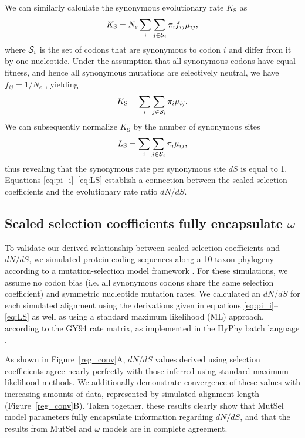 \documentclass[11pt]{article}
\begin{document}
We can similarly calculate the synonymous evolutionary rate $K_\text{S}$ as 
\begin{equation}\label{eq:KS}
  K_\text{S} = N_e \sum_i \sum_{j \in {\cal S}_i} \pi_i  f_{ij}\mu_{ij},
\end{equation} where ${\cal S}_i$ is the set of codons that are synonymous to codon $i$ and differ from it by one nucleotide. Under the assumption that all synonymous codons have equal fitness, and hence all synonymous mutations are selectively neutral, we have $f_{ij}=1/N_e$ \cite{CrowKimura1970}, yielding \begin{equation}\label{eq:KS_2}
  K_\text{S} = \sum_i \sum_{j \in {\cal S}_i} \pi_i  \mu_{ij}.
\end{equation} We can subsequently normalize $K_\text{S}$ by the number of synonymous sites 
\begin{equation}\label{eq:LS}
  L_\text{S} = \sum_i \sum_{j \in {\cal S}_i} \pi_i \mu_{ij}, 
\end{equation} thus revealing that the synonymous rate per synonymous site $dS$ is equal to 1. 
Equations \eqref{eq:pi_i}--\eqref{eq:LS} establish a connection between the scaled selection coefficients and the evolutionary rate ratio $dN/dS$. 


\subsection*{Scaled selection coefficients fully encapsulate $\omega$}

To validate our derived relationship between scaled selection coefficients and $dN/dS$, we simulated protein-coding sequences along a 10-taxon phylogeny according to a mutation-selection model framework \cite{HalpernBruno1998,SellaHirsh2005}. For these simulations, we assume no codon bias (i.e. all synonymous codons share the same selection coefficient) and symmetric nucleotide mutation rates. We calculated an $dN/dS$ for each simulated alignment using the derivations given in equations \eqref{eq:pi_i}--\eqref{eq:LS} as well as using a standard maximum likelihood (ML) approach, according to the GY94 \cite{GoldmanYang1994} rate matrix, as implemented in the HyPhy batch language \cite{KosakovskyPondetal2005}.

As shown in Figure~\ref{reg_conv}A, $dN/dS$ values derived using selection coefficients agree nearly perfectly with those inferred using standard maximum likelihood methods. We additionally demonstrate convergence of these values with increasing amounts of data, represented by simulated alignment length (Figure~\ref{reg_conv}B). Taken together, these results clearly show that MutSel model parameters fully encapsulate information regarding $dN/dS$, and that the results from MutSel and $\omega$ models are in complete agreement. 
\end{document}
